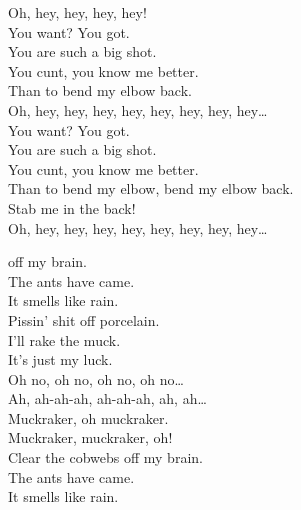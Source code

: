 
\label{album:12-bar-bruise}




Oh, hey, hey, hey, hey! \\

You want? You got. \\
You are such a big shot. \\
You cunt, you know me better. \\
Than to bend my elbow back. \\

Oh, hey, hey, hey, hey, hey, hey, hey, hey… \\

You want? You got. \\
You are such a big shot. \\
You cunt, you know me better. \\
Than to bend my elbow, bend my elbow back. \\
Stab me in the back! \\

Oh, hey, hey, hey, hey, hey, hey, hey, hey… \\




 off my brain. \\
The ants have came. \\
It smells like rain. \\

Pissin' shit off porcelain. \\
I'll rake the muck. \\
It's just my luck. \\

Oh no, oh no, oh no, oh no… \\

Ah, ah-ah-ah, ah-ah-ah, ah, ah… \\
Muckraker, oh muckraker. \\
Muckraker, muckraker, oh! \\

Clear the cobwebs off my brain. \\
The ants have came. \\
It smells like rain. \\

